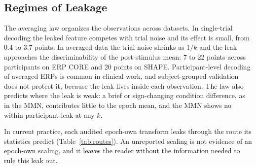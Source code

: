 \subsection{Regimes of Leakage}
The averaging law organizes the observations across datasets. In single-trial decoding the leaked feature competes with trial noise and its effect is small, from 0.4 to 3.7 points. In averaged data the trial noise shrinks as $1/k$ and the leak approaches the discriminability of the post-stimulus mean: 7 to 22 points across participants on ERP CORE and 20 points on SHAPE. Participant-level decoding of averaged ERPs is common in clinical work, and subject-grouped validation does not protect it, because the leak lives inside each observation. The law also predicts where the leak is weak: a brief or sign-changing condition difference, as in the MMN, contributes little to the epoch mean, and the MMN shows no within-participant leak at any $k$.

In current practice, each audited epoch-own transform leaks through the route its statistics predict (Table~\ref{tab:routes}). An unreported scaling is not evidence of an epoch-own scaling, and it leaves the reader without the information needed to rule this leak out.
